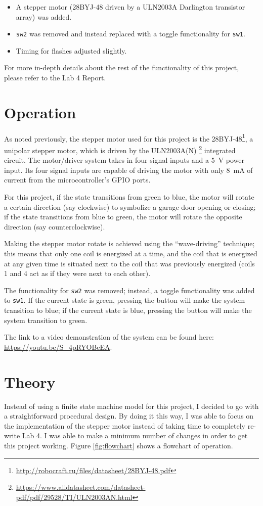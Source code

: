 \documentclass{article}
\renewcommand{\c}[1]{\texttt{#1}}
\begin{document}
\begin{itemize}
    \item A stepper motor (28BYJ-48 driven by a ULN2003A
    Darlington transistor array) was added.
    \item \c{sw2} was removed and instead replaced with a
    toggle functionality for \c{sw1}.
    \item Timing for flashes adjusted slightly.
\end{itemize}

For more in-depth details about the rest of the functionality
of this project, please refer to the Lab 4 Report.

\section{Operation} As noted previously, the stepper
motor used for this project is the
28BYJ-48\footnote{\url{http://robocraft.ru/files/datasheet/28BYJ-48.pdf}}, a unipolar
stepper motor, which is driven by the ULN2003A(N)%
\footnote{\url{https://www.alldatasheet.com/datasheet-pdf/pdf/29528/TI/ULN2003AN.html}}
integrated circuit. The motor/driver system takes
in four signal inputs and a \SI{5}{V} power input. Its four
signal inputs are capable of driving the motor with only
\SI{8}{\milli\ampere} of current from the microcontroller's
GPIO ports.

For this project, if the state transitions from green to
blue, the motor will rotate a certain direction (say clockwise)
to symbolize a garage door opening or closing; if the state
transitions from blue to green, the motor will rotate the
opposite direction (say counterclockwise).

Making the stepper motor rotate is achieved using the
``wave-driving'' technique; this means that only one coil is
energized at a time, and the coil that is energized at any
given time is situated next to the coil that was previously
energized (coils 1 and 4 act as if they were next to each other).

The functionality for \c{sw2}
was removed; instead, a toggle functionality was added to \c{sw1}.
If the current state is green, pressing the button will
make the system transition to blue;
if the current state is blue, pressing the button will
make the system transition to green.

The link to a video demonstration of the system can be found
here: \url{https://youtu.be/S_4pRYOBeEA}.

\section{Theory} Instead of using a finite state machine
model for this project, I decided to go with a
straightforward procedural design. By doing it this way, I was
able to focus on the implementation of the stepper motor
instead of taking time to completely re-write Lab 4.
I was able to make a minimum number of changes in order to
get this project working. Figure \ref{fig:flowchart} shows
a flowchart of operation.
\end{document}
